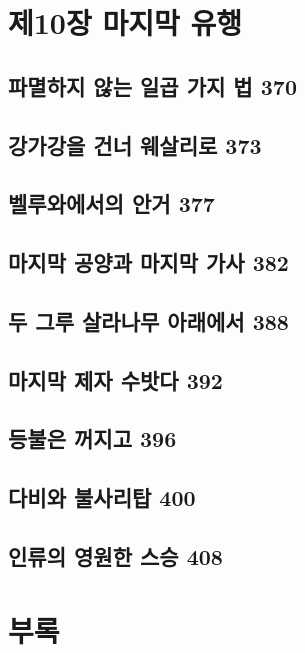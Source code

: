 \documentclass[12pt, a4paper, oneside]{book}
\let\stdsection\section
\renewcommand\section{\newpage\stdsection}
\begin{document}
	\chapter{제10장 마지막 유행}
	\noptcrule
	\parttoc				


	\section{파멸하지 않는 일곱 가지 법 370 }

	\section{강가강을 건너 웨살리로 373 }

	\section{벨루와에서의 안거 377 }

	\section{마지막 공양과 마지막 가사 382 }

	\section{두 그루 살라나무 아래에서 388 }

	\section{마지막 제자 수밧다 392 }

	\section{등불은 꺼지고 396 }

	\section{다비와 불사리탑 400 }

	\section{인류의 영원한 스승 408}


	\chapter{부록}
	\noptcrule
	\parttoc				
\end{document}
